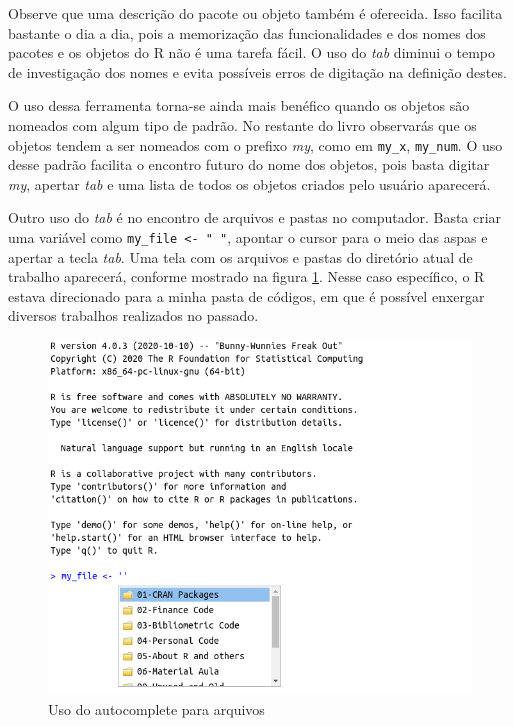 \documentclass[
  11pt,
]{book}
\begin{document}
Observe que uma descrição do pacote ou objeto também é oferecida. Isso facilita bastante o dia a dia, pois a memorização das funcionalidades e dos nomes dos pacotes e os objetos do R não é uma tarefa fácil. O uso do \emph{tab} diminui o tempo de investigação dos nomes e evita possíveis erros de digitação na definição destes.

O uso dessa ferramenta torna-se ainda mais benéfico quando os objetos são nomeados com algum tipo de padrão. No restante do livro observarás que os objetos tendem a ser nomeados com o prefixo \emph{my}, como em \texttt{my\_x}, \texttt{my\_num}. O uso desse padrão facilita o encontro futuro do nome dos objetos, pois basta digitar \emph{my}, apertar \emph{tab} e uma lista de todos os objetos criados pelo usuário aparecerá.

Outro uso do \emph{tab} é no encontro de arquivos e pastas no computador. Basta criar uma variável como \texttt{my\_file\ \textless{}-\ "\ "}, apontar o cursor para o meio das aspas e apertar a tecla \emph{tab}. Uma tela com os arquivos e pastas do diretório atual de trabalho aparecerá, conforme mostrado na figura \ref{fig:autocomplete-arquivos}. Nesse caso específico, o R estava direcionado para a minha pasta de códigos, em que é possível enxergar diversos trabalhos realizados no passado.

\begin{figure}[!htbp]

{\centering \includegraphics[width=1\linewidth]{00-text-resources/figs/autocomplete_arquivos} 

}

\caption{Uso do autocomplete para arquivos}\label{fig:autocomplete-arquivos}
\end{figure}
\end{document}
